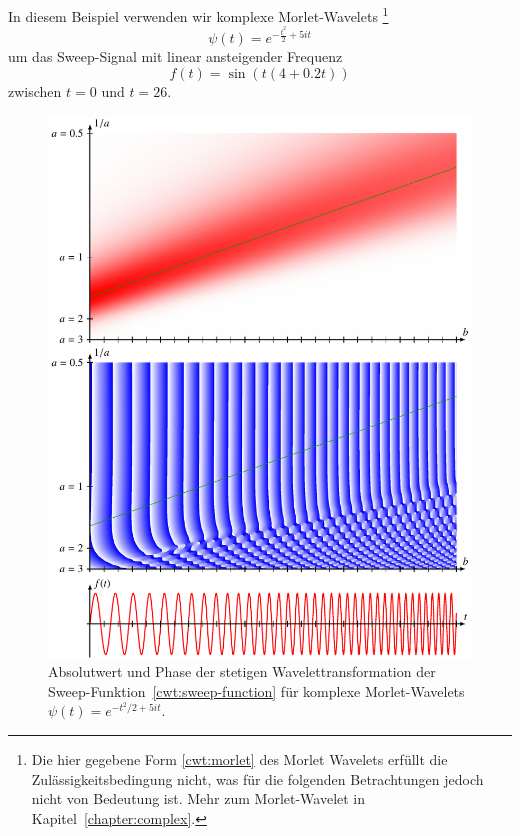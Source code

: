 \begin{beispiel}
In diesem Beispiel verwenden wir komplexe Morlet-Wavelets%
\footnote{Die hier gegebene Form \eqref{cwt:morlet} des Morlet Wavelets
erfüllt die Zulässigkeitsbedingung nicht, was für die folgenden 
Betrachtungen jedoch nicht von Bedeutung ist.
Mehr zum Morlet-Wavelet in Kapitel~\ref{chapter:complex}.}
%
\begin{equation}
\psi(t) = e^{-\frac{t^2}2 +5it}
\label{cwt:morlet}
\end{equation}
um das Sweep-Signal mit linear ansteigender Frequenz
%
\begin{equation}
f(t)
=
\sin(t(4+0.2t))
\label{cwt:sweep-function}
\end{equation}
zwischen $t=0$ und $t=26$.
\begin{figure}
\centering
\includegraphics[width=\hsize]{chapters/4-cwt/images/sweep2.pdf}
\caption{Absolutwert und Phase der stetigen Wavelettransformation
der Sweep-Funktion~\eqref{cwt:sweep-function} 
für komplexe Morlet-Wavelets $\psi(t) = e^{-t^2/2+5it}$.
}
\end{figure}
\end{beispiel}
